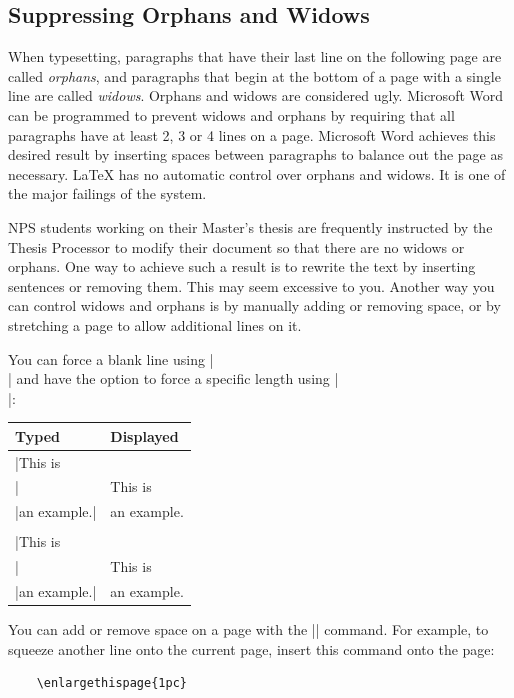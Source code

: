 \subsection{Suppressing Orphans and Widows}

When typesetting, paragraphs that have their last line on the following page
are called \emph{orphans}, and paragraphs that begin at the bottom of a page
with a single line are called \emph{widows}. Orphans and widows are considered
ugly. Microsoft Word can be programmed to prevent widows and orphans by
requiring that all paragraphs have at least 2, 3 or 4 lines on a page.
Microsoft Word achieves this desired result by inserting spaces between
paragraphs to balance out the page as necessary. \LaTeX{} has no automatic
control over orphans and widows. It is one of the major failings of the system.

NPS students working on their Master's thesis are frequently instructed by the
Thesis Processor to modify their document so that there are no widows or
orphans. One way to achieve such a result is to rewrite the text by inserting
sentences or removing them. This may seem excessive to you. Another way you can
control widows and orphans is by manually adding or removing space, or by
stretching a page to allow additional lines on it.

You can force a blank line using |\\| and have the option to force a
specific length using |\\[3pt]|:
\begin{center}
\begin{tabular}{l|l}
Typed        & Displayed\\\hline
|This is\\|  & This is\\
|an example.| & an example.\\
\\
|This is\\[3pt]|  & This is\\[3pt]
|an example.| & an example.
\end{tabular}
\end{center}

You can add or remove space on a page with the |\enlargethispage| command. For
example, to squeeze another line onto the current page, insert this command
onto the page:

\begin{verbatim}
    \enlargethispage{1pc}
\end{verbatim}

